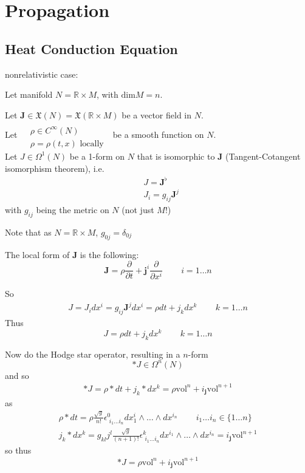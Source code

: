 \section{Propagation}

\subsection*{Heat Conduction Equation}

nonrelativistic case: 

Let manifold $N = \mathbb{R} \times M$, with $\text{dim}M = n$.  

Let $\mathbf{J} \in \mathfrak{X}(N) = \mathfrak{X}(\mathbb{R}\times M)$ be a vector field in $N$.  \\
Let $\begin{aligned} & \quad \\ 
  & \rho \in C^{\infty}(N) \\ 
  & \rho = \rho(t,x) \text{ locally } \end{aligned}$ be a smooth function on $N$.  \\
Let $J \in \Omega^1(N)$ be a 1-form on $N$ that is isomorphic to $\mathbf{J}$ (Tangent-Cotangent isomorphism theorem), i.e.
\[
\begin{aligned}
& J = \mathbf{J}^{\flat}  \\
& J_i = g_{ij} \mathbf{J}^j
\end{aligned}
\]
with $g_{ij}$ being the metric on $N$ (not just $M$!)

Note that as $N = \mathbb{R}\times M$, $g_{0j} = \delta_{0j}$

The local form of $\mathbf{J}$ is the following:
\[
\mathbf{J} = \rho \frac{ \partial }{ \partial t} + \mathbf{j}^i \frac{ \partial }{ \partial x^i} \quad \quad \, i=1\dots n
\]

So 
\[
\begin{gathered}
  J = J_i dx^i = g_{ij} \mathbf{J}^j dx^i = \rho dt + j_k dx^k \quad \quad \, k = 1 \dots n 
\end{gathered}
\]
Thus
\begin{equation}
  J = \rho dt + j_k dx^k \quad \quad \, k=1\dots n
\end{equation}

Now do the Hodge star operator, resulting in a $n$-form
\[
*J \in \Omega^n(N)
\]
and so
\[
\begin{gathered}
  *J = \rho * dt + j_k * dx^k = \rho \text{vol}^n + i_{\mathbf{j}}\text{vol}^{n+1}
\end{gathered}
\]
as
\[
\begin{gathered}
  \rho * dt = \rho \frac{ \sqrt{g}}{ n !} \epsilon^0_{ \, \, i_1 \dots i_n} dx^i_1 \wedge \dots \wedge dx^{i_n} \quad \quad \, i_1 \dots i_n \in \lbrace 1 \dots n \rbrace \\ 
  j_k * dx^k = g_{kl} j^l \frac{ \sqrt{g}}{ (n+1)!} \epsilon^k_{ \, \, i_1 \dots i_n} dx^{i_1} \wedge \dots \wedge dx^{i_n} = i_{\mathbf{j}} \text{vol}^{n+1} 
\end{gathered}
\]
so thus
\[
*J = \rho \text{vol}^n + i_{\mathbf{j}} \text{vol}^{n+1}
\]

